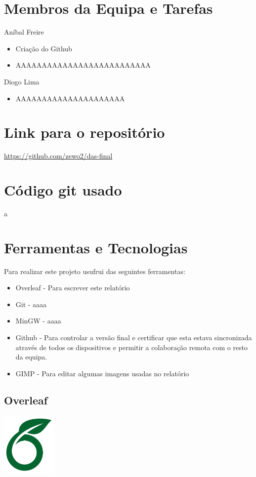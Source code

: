 \documentclass[a4paper,12pt]{article}
\begin{document}
\section{Membros da Equipa e Tarefas}

Aníbal Freire
\begin{itemize}
    \item Criação do Github
    \item AAAAAAAAAAAAAAAAAAAAAAAAAA
\end{itemize}
\vspace{0.2cm}

\noindent
Diogo Lima
\begin{itemize}
    \item AAAAAAAAAAAAAAAAAAAAA
\end{itemize}
\vspace{0.2cm}

\newpage
\section{Link para o repositório}

\url{https://github.com/zewo2/das-final}

\section{Código git usado}

a

\section{Ferramentas e Tecnologias}
Para realizar este projeto usufrui das seguintes ferramentas:
\begin{itemize}
    \item Overleaf - Para escrever este relatório
    \item Git - aaaa
    \item MinGW - aaaa
    \item Github - Para  controlar a versão final e certificar que esta estava sincronizada através de todos os dispositivos e permitir a colaboração remota com o resto da equipa.
    \item GIMP - Para editar algumas imagens usadas no relatório
\end{itemize}

\subsection{Overleaf}
    \includegraphics[width=0.2\textwidth]{overleaf.jpg} %
    \vspace{0.5cm}
\end{document}
